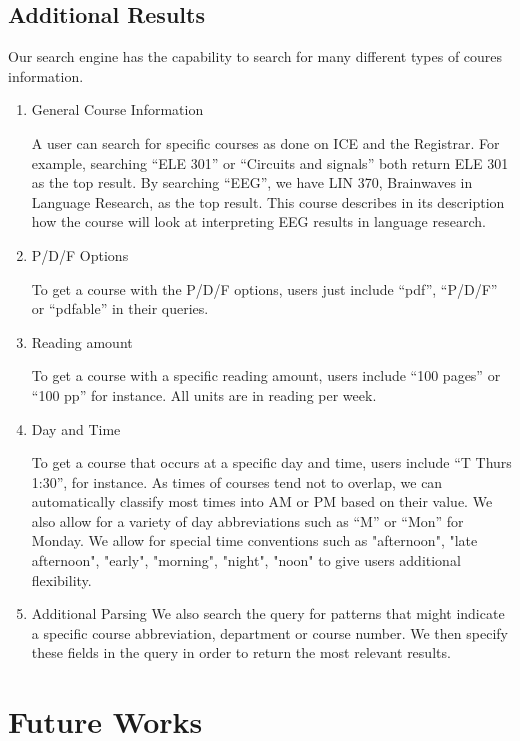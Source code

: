 \documentclass[12pt,letterpaper]{article}
\begin{document}
\subsection{Additional Results}
Our search engine has the capability to search for many different types of coures information. 

\begin{enumerate}
\item General Course Information

	A user can search for specific courses as done on ICE and the Registrar. For example, searching ``ELE 301'' or ``Circuits and signals'' both return ELE 301 as the top result. By searching ``EEG'', we have LIN 370, Brainwaves in Language Research, as the top result. This course describes in its description how the course will look at interpreting EEG results in language research. 
	
\item P/D/F Options

To get a course with the P/D/F options, users just include ``pdf'', ``P/D/F'' or ``pdfable'' in their queries. 

\item Reading amount

To get a course with a specific reading amount, users include ``100 pages'' or ``100 pp'' for instance. All units are in reading per week. 

\item Day and Time

To get a course that occurs at a specific day and time, users include ``T Thurs 1:30'', for instance. As times of courses tend not to overlap, we can automatically classify most times into AM or PM based on their value. We also allow for a variety of day abbreviations such as ``M'' or ``Mon'' for Monday. We allow for special time conventions such as "afternoon", "late afternoon", "early", "morning", "night", "noon" to give users additional flexibility.

\item Additional Parsing
We also search the query for patterns that might indicate a specific course abbreviation, department or course number. We then specify these fields in the query in order to return the most relevant results.  

\end{enumerate}

\section{Future Works}
\end{document}
